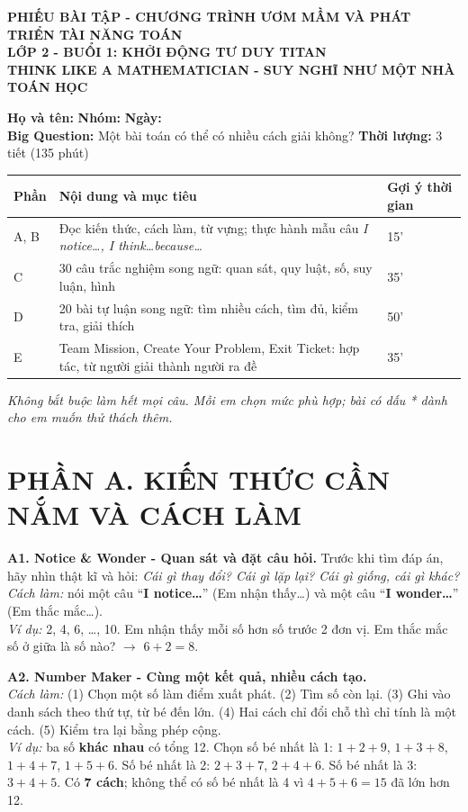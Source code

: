 \documentclass[11pt,a4paper]{article}
\newcommand{\shortblank}[1]{\makebox[#1]{\dotfill}}
\begin{document}
\begin{center}
{\Large\textbf{PHIẾU BÀI TẬP - CHƯƠNG TRÌNH ƯƠM MẦM VÀ PHÁT TRIỂN TÀI NĂNG TOÁN}}\\[1mm]
{\large\textbf{LỚP 2 - BUỔI 1: KHỞI ĐỘNG TƯ DUY TITAN}}\\[-0.5mm]
{\normalsize\textbf{THINK LIKE A MATHEMATICIAN - SUY NGHĨ NHƯ MỘT NHÀ TOÁN HỌC}}
\end{center}
\noindent\textbf{Họ và tên:} \shortblank{70mm} \hfill \textbf{Nhóm:} \shortblank{25mm} \hfill \textbf{Ngày:} \shortblank{30mm}\\
\textbf{Big Question:} Một bài toán có thể có nhiều cách giải không? \hfill \textbf{Thời lượng:} 3 tiết (135 phút)

\begin{tabularx}{\linewidth}{|p{20mm}|X|p{22mm}|}\hline
\textbf{Phần} & \textbf{Nội dung và mục tiêu} & \textbf{Gợi ý thời gian}\\\hline
A, B & Đọc kiến thức, cách làm, từ vựng; thực hành mẫu câu \textit{I notice\ldots, I think\ldots because\ldots} & 15'\\\hline
C & 30 câu trắc nghiệm song ngữ: quan sát, quy luật, số, suy luận, hình & 35'\\\hline
D & 20 bài tự luận song ngữ: tìm nhiều cách, tìm đủ, kiểm tra, giải thích & 50'\\\hline
E & Team Mission, Create Your Problem, Exit Ticket: hợp tác, từ người giải thành người ra đề & 35'\\\hline
\end{tabularx}
\textit{Không bắt buộc làm hết mọi câu. Mỗi em chọn mức phù hợp; bài có dấu * dành cho em muốn thử thách thêm.}

\section*{PHẦN A. KIẾN THỨC CẦN NẮM VÀ CÁCH LÀM}
\textbf{A1. Notice \& Wonder - Quan sát và đặt câu hỏi.} Trước khi tìm đáp án, hãy nhìn thật kĩ và hỏi: \textit{Cái gì thay đổi? Cái gì lặp lại? Cái gì giống, cái gì khác?}\\
\textit{Cách làm:} nói một câu ``\textbf{I notice\ldots}'' (Em nhận thấy\ldots) và một câu ``\textbf{I wonder\ldots}'' (Em thắc mắc\ldots).\\
\textit{Ví dụ:} 2, 4, 6, \ldots, 10. Em nhận thấy mỗi số hơn số trước 2 đơn vị. Em thắc mắc số ở giữa là số nào? $\rightarrow$ $6+2=8$.

\textbf{A2. Number Maker - Cùng một kết quả, nhiều cách tạo.}\\
\textit{Cách làm:} (1) Chọn một số làm điểm xuất phát. (2) Tìm số còn lại. (3) Ghi vào danh sách theo thứ tự, từ bé đến lớn. (4) Hai cách chỉ đổi chỗ thì chỉ tính là một cách. (5) Kiểm tra lại bằng phép cộng.\\
\textit{Ví dụ:} ba số \textbf{khác nhau} có tổng 12. Chọn số bé nhất là 1: $1+2+9$, $1+3+8$, $1+4+7$, $1+5+6$. Số bé nhất là 2: $2+3+7$, $2+4+6$. Số bé nhất là 3: $3+4+5$. Có \textbf{7 cách}; không thể có số bé nhất là 4 vì $4+5+6=15$ đã lớn hơn 12.
\end{document}
